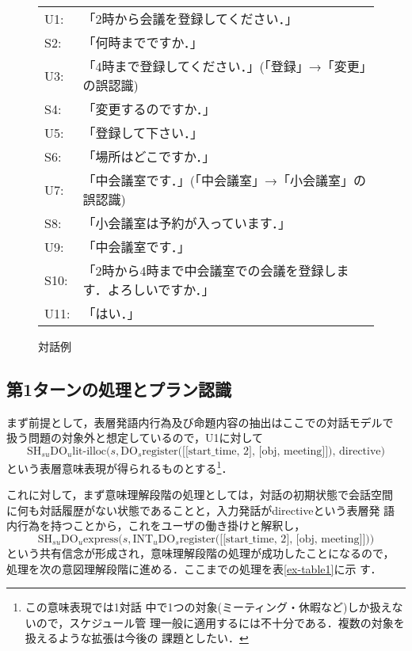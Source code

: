 \begin{figure}[htbp]
\begin{center}
\begin{tabular}{ll}
U1: & 「2時から会議を登録してください．」\\
S2: & 「何時までですか．」\\
U3: & 「4時まで登録してください．」(「登録」→「変更」の誤認識)\\
S4: & 「変更するのですか．」\\
U5: & 「登録して下さい．」\\
S6: & 「場所はどこですか．」\\
U7: & 「中会議室です．」(「中会議室」→「小会議室」の誤認識)\\
S8: & 「小会議室は予約が入っています．」\\
U9: & 「中会議室です．」\\
S10: & 「2時から4時まで中会議室での会議を登録します．よろしいですか．」\\
U11: & 「はい．」\\
\end{tabular}
\end{center}
\caption{対話例}
\label{example}
\end{figure}

\subsection{第1ターンの処理とプラン認識}

まず前提として，表層発語内行為及び命題内容の抽出はここでの対話モデルで
扱う問題の対象外と想定しているので，U1に対して
\begin{equation}
\mbox{SH}_{su} \mbox{DO}_u \mbox{lit-illoc(} s, \mbox{DO}_s
\mbox{register([[start\_time, 2], [obj, meeting]]), directive)}
\end{equation}
という表層意味表現が得られるものとする\footnote{この意味表現では1対話
中で1つの対象(ミーティング・休暇など)しか扱えないので，スケジュール管
\mbox{理一般に適用す}るには不十分である．複数の対象を扱えるような拡張は今後の
課題としたい．}．

これに対して，まず意味理解段階の処理としては，対話の初期状態で会話空間
に何も対話履歴がない状態であることと，入力発話がdirectiveという表層発
語内行為を持つことから，これをユーザの働き掛けと解釈し，
\begin{equation}
\mbox{SH}_{su} \mbox{DO}_u \mbox{express(}s, \mbox{INT}_u \mbox{DO}_s
\mbox{register([[start\_time, 2], [obj, meeting]]))}
\end{equation}
という共有信念が形成され，意味理解段階の処理が成功したことになるので，
処理を次の意図理解段階に進める．ここまでの処理を表\ref{ex-table1}に示
す．

